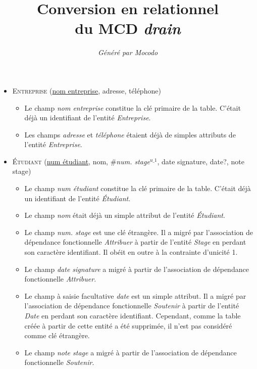 \documentclass[a4paper]{article}
\title{Conversion en relationnel\\du MCD \emph{drain}}
\author{\emph{Généré par Mocodo}}
\newcommand{\relat}[1]{\textsc{#1}}
\newcommand{\attr}[1]{#1}
\newcommand{\prim}[1]{\uline{#1}}
\newcommand{\foreign}[1]{\#\textsl{#1}}
\begin{document}
\maketitle

\begin{itemize}
  \item \relat{Entreprise} (\prim{nom entreprise}, \attr{adresse}, \attr{téléphone})
  \begin{itemize}
    \item Le champ \emph{nom entreprise} constitue la clé primaire de la table. C'était déjà un identifiant de l'entité \emph{Entreprise}.
    \item Les champs \emph{adresse} et \emph{téléphone} étaient déjà de simples attributs de l'entité \emph{Entreprise}.
  \end{itemize}

  \item \relat{Étudiant} (\prim{num étudiant}, \attr{nom}, \foreign{num. stage}$^{u\_1}$, \attr{date signature}, \attr{date?}, \attr{note stage})
  \begin{itemize}
    \item Le champ \emph{num étudiant} constitue la clé primaire de la table. C'était déjà un identifiant de l'entité \emph{Étudiant}.
    \item Le champ \emph{nom} était déjà un simple attribut de l'entité \emph{Étudiant}.
    \item Le champ \emph{num. stage} est une clé étrangère. Il a migré par l'association de dépendance fonctionnelle \emph{Attribuer} à partir de l'entité \emph{Stage} en perdant son caractère identifiant. Il obéit en outre à la contrainte d'unicité 1.
    \item Le champ \emph{date signature} a migré à partir de l'association de dépendance fonctionnelle \emph{Attribuer}.
    \item Le champ à saisie facultative \emph{date} est un simple attribut. Il a migré par l'association de dépendance fonctionnelle \emph{Soutenir} à partir de l'entité \emph{Date} en perdant son caractère identifiant. Cependant, comme la table créée à partir de cette entité a été supprimée, il n'est pas considéré comme clé étrangère.
    \item Le champ \emph{note stage} a migré à partir de l'association de dépendance fonctionnelle \emph{Soutenir}.
  \end{itemize}


\end{itemize}
\end{document}
